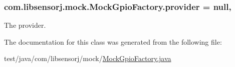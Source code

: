 \subsubsection[{provider}]{ com.\+libsensorj.\+mock.\+Mock\+Gpio\+Factory.\+provider = null\hspace{0.3cm}{\ttfamily [static]}, {\ttfamily [private]}}\label{classcom_1_1libsensorj_1_1mock_1_1MockGpioFactory_aa7cf0e5787b3ffe138f0cea0668df93e}
The provider. 

The documentation for this class was generated from the following file\+:\begin{DoxyCompactItemize}
\item 
test/java/com/libsensorj/mock/\hyperlink{MockGpioFactory_8java}{Mock\+Gpio\+Factory.\+java}\end{DoxyCompactItemize}
